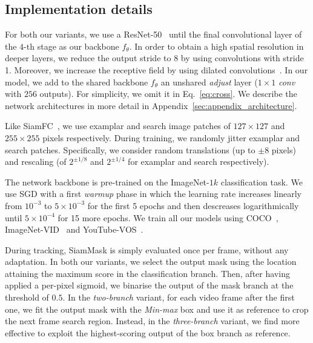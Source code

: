 \subsection{Implementation details}
For both our variants, we use a ResNet-50~\cite{he2016deep} until the final convolutional layer of the \mbox{$4$-th} stage as our backbone $f_\theta$.
In order to obtain a high spatial resolution in deeper layers, we reduce the output stride to $8$ by using convolutions with stride 1.
Moreover, we increase the receptive field by using dilated convolutions~\cite{chen2018deeplab}.
In our model, we add to the shared backbone $f_{\theta}$ an unshared \emph{adjust} layer ($1{\times}1$ \textit{conv} with $256$ outputs). 
For simplicity, we omit it in Eq.~\ref{eq:cross}.
We describe the network architectures in more detail in Appendix~\ref{sec:appendix_architecture}.

Like SiamFC~\cite{bertinetto2016fully}, we use examplar and search image patches of $127{\times}127$ and $255{\times}255$ pixels respectively.
During training, we randomly jitter examplar and search patches.
Specifically, we consider random translations (up to $\pm 8$ pixels) and rescaling (of $2^{\pm 1/8}$ and $2^{\pm 1/4}$ for examplar and search respectively).

The network backbone is pre-trained on the \mbox{ImageNet-$1k$} classification task.
We use SGD with a first \emph{warmup} phase in which the learning rate increases linearly from $10^{-3}$ to $5{\times}10^{-3}$ for the first 5 epochs and then descreases logarithmically until $5{\times}10^{-4}$ for 15 more epochs.
We train all our models using COCO~\cite{lin2014microsoft}, ImageNet-VID~\cite{russakovsky2015imagenet} and YouTube-VOS~\cite{xu2018youtube}. 

During tracking, SiamMask is simply evaluated once per frame, without any adaptation.
In both our variants, we select the output mask using the location attaining the maximum score in the classification branch.
Then, after having applied a per-pixel sigmoid, we binarise the output of the mask branch at the threshold of $0.5$.
In the \textit{two-branch} variant, for each video frame after the first one, we fit the output mask with the \emph{Min-max} box and use it as reference to crop the next frame search region.
Instead, in the \textit{three-branch} variant, we find more effective to exploit the highest-scoring output of the box branch as reference.

